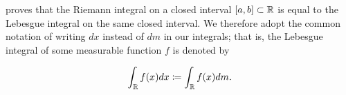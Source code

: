 \medskip

{\cite[Chapter 2, Theorem 1.5]{stein}} proves that the Riemann integral on a closed interval $[a,b] \subset \mathbb{R}$ is equal to the Lebesgue integral on the same closed interval. We therefore adopt the common notation of writing $d x$ instead of $d m$ in our integrals; that is, the Lebesgue integral of some measurable function $f$ is denoted by

\begin{equation*}
  \int_{\mathbb{R}} f(x) d x \coloneqq \int_{\mathbb{R}} f(x) d m.
\end{equation*}
